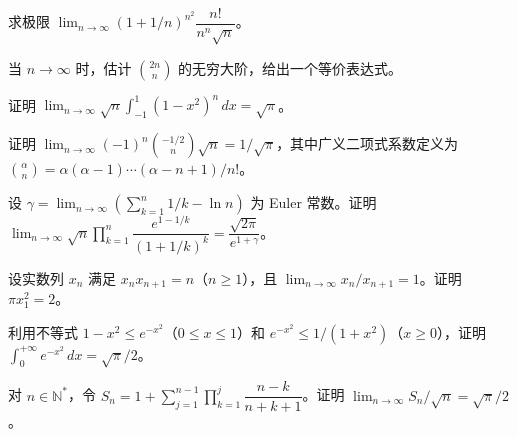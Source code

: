 \noindent\begin{minipage}{\textwidth}
求极限 $\lim_{n\to\infty}(1+1/n)^{n^2}\dfrac{n!}{n^n\sqrt n}$。
\end{minipage}\par\vfill
\noindent\begin{minipage}{\textwidth}
当 $n\to\infty$ 时，估计 $\binom{2n}n$ 的无穷大阶，给出一个等价表达式。
\end{minipage}\par\vfill
\newpage
\noindent\begin{minipage}{\textwidth}
证明 $\lim_{n\to\infty}\sqrt n\int_{-1}^1(1-x^2)^n\,dx=\sqrt\pi$。
\end{minipage}\par\vfill
\noindent\begin{minipage}{\textwidth}
证明 $\lim_{n\to\infty}(-1)^n\binom{-1/2}n\sqrt n=1/\sqrt\pi$，其中广义二项式系数定义为 $\binom\alpha n=\alpha(\alpha-1)\cdots(\alpha-n+1)/n!$。
\end{minipage}\par\vfill
\noindent\begin{minipage}{\textwidth}
设 $\gamma=\lim_{n\to\infty}(\sum_{k=1}^n1/k-\ln n)$ 为 Euler 常数。证明 $\lim_{n\to\infty}\sqrt n\prod_{k=1}^n\dfrac{e^{1-1/k}}{(1+1/k)^k}=\dfrac{\sqrt{2\pi}}{e^{1+\gamma}}$。
\end{minipage}\par\vfill
\newpage
\noindent\begin{minipage}{\textwidth}
设实数列 $x_n$ 满足 $x_nx_{n+1}=n$（$n\ge1$），且 $\lim_{n\to\infty}x_n/x_{n+1}=1$。证明 $\pi x_1^2=2$。
\end{minipage}\par\vfill
\noindent\begin{minipage}{\textwidth}
利用不等式 $1-x^2\le e^{-x^2}$（$0\le x\le1$）和 $e^{-x^2}\le1/(1+x^2)$（$x\ge0$），证明 $\int_0^{+\infty}e^{-x^2}\,dx=\sqrt\pi/2$。
\end{minipage}\par\vfill
\noindent\begin{minipage}{\textwidth}
对 $n\in\mathbb N^*$，令 $S_n=1+\sum_{j=1}^{n-1}\prod_{k=1}^j\dfrac{n-k}{n+k+1}$。证明 $\lim_{n\to\infty}S_n/\sqrt n=\sqrt\pi/2$。
\end{minipage}\par\vfill
